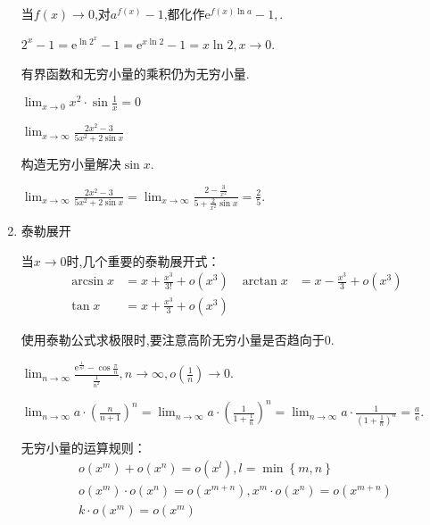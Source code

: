 \begin{enumerate}
当$f(x)\to 0$,对$a^{f(x)}-1$,都化作$\mathrm{e} ^{{f(x)}\ln a}-1,$.
\begin{examp}
    $2^x-1=\mathrm{e} ^{\ln 2^x}-1=\mathrm{e} ^{x\ln 2}-1=x\ln 2,x\to 0$.
\end{examp}

\begin{ttheorem}
    有界函数和无穷小量的乘积仍为无穷小量.
\end{ttheorem}

\begin{examp}{$\lim_{x \to 0} x^2\cdot\sin \frac{1}{x}=0$}
    
\end{examp}

\begin{examp}{$\lim_{x \to \infty} \frac{2x^2-3}{5x^2+2\sin x}$}

    \jie 构造无穷小量解决$\sin x$.
    
    $\lim_{x \to \infty} \frac{2x^2-3}{5x^2+2\sin x}=\lim_{x \to \infty} \frac{2-\frac{3}{x^2}}{5+\frac{2}{x^2}\sin x}=\frac{2}{5}.$
\end{examp}

\item 泰勒展开

当$x\to 0$时,几个重要的泰勒展开式：
\begin{align*}
    \arcsin x &= x +\frac{x^3}{3!}+o(x^3) & \arctan x &= x -\frac{x^3}{3}+o(x^3)\\
    \tan x &=x+\frac{x^3}{3}+o(x^3) & &
\end{align*}

使用泰勒公式求极限时,要注意高阶无穷小量是否趋向于0.
\begin{examp}
    {$\lim_{n \to \infty} \frac{\mathrm{e} ^{\frac{1}{n^2}}-\cos \frac{\pi}{n}}{\frac{1}{n^2}},n \to \infty,o(\frac{1}{n}) \to 0.$}
\end{examp}

\begin{examp}
    {$\lim_{n \to \infty} a\cdot \left( \frac{n}{n+1} \right)^n=\lim_{n \to \infty} a\cdot \left( \frac{1}{1+\frac{1}{n}} \right)^n=\lim_{n \to \infty} a\cdot  \frac{1}{\left(1+\frac{1}{n}\right) ^n} =\frac{a}{\mathrm{e} }.$}
\end{examp}

无穷小量的运算规则：
\begin{gather*}
    o(x^m)+o(x^n)=o(x^l),l=\min\left\{m,n\right\} \\
    o(x^m)\cdot o(x^n)=o(x^{m+n}),x^m\cdot o(x^n)=o(x^{m+n})\\
    k\cdot o(x^m)=o(x^m)
\end{gather*}


\end{enumerate}

